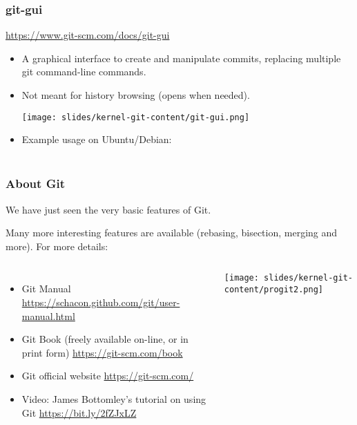 \begin{frame}
  \frametitle{git-gui}
  \url{https://www.git-scm.com/docs/git-gui}
  \begin{itemize}
  \item A graphical interface to create and manipulate commits,
    replacing multiple git command-line commands.
  \item Not meant for history browsing (opens 
    when needed).
  \begin{center}
    \texttt{[image: slides/kernel-git-content/git-gui.png]}
  \end{center}
  \item Example usage on Ubuntu/Debian:\\
    \\
  \end{itemize}
\end{frame}


\begin{frame}
  \frametitle{About Git}
  We have just seen the very basic features of Git.

  Many more interesting features are available (rebasing,
  bisection, merging and more). For more details:
  \begin{columns}
    \begin{itemize}
    \item Git Manual
      \newline \url{https://schacon.github.com/git/user-manual.html}
    \item Git Book (freely available on-line, or in print form)
      \newline \url{https://git-scm.com/book}
    \item Git official website
      \newline \url{https://git-scm.com/}
    \item Video: James Bottomley's tutorial on using Git
      \newline \url{https://bit.ly/2fZJxLZ}
    \end{itemize}
    \texttt{[image: slides/kernel-git-content/progit2.png]}
  \end{columns}
\end{frame}

